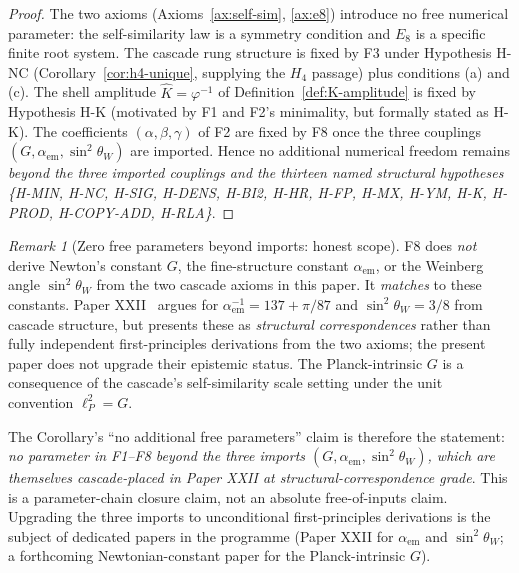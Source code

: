 \documentclass[12pt]{article}
\theoremstyle{definition}
\theoremstyle{remark}
\newtheorem{remark}[theorem]{Remark}
\begin{document}
\begin{proof}
The two axioms (Axioms~\ref{ax:self-sim}, \ref{ax:e8}) introduce no free numerical parameter: the self-similarity law is a symmetry condition and $E_8$ is a specific finite root system. The cascade rung structure is fixed by F3 under Hypothesis H-NC (Corollary~\ref{cor:h4-unique}, supplying the $H_4$ passage) plus conditions (a) and (c). The shell amplitude $\widehat{K} = \varphi^{-1}$ of Definition~\ref{def:K-amplitude} is fixed by Hypothesis H-K (motivated by F1 and F2's minimality, but formally stated as H-K). The coefficients $(\alpha, \beta, \gamma)$ of F2 are fixed by F8 once the three couplings $(G, \alpha_{\mathrm{em}}, \sin^2\theta_W)$ are imported. Hence no additional numerical freedom remains \emph{beyond the three imported couplings and the thirteen named structural hypotheses \{H-MIN, H-NC, H-SIG, H-DENS, H-BI2, H-HR, H-FP, H-MX, H-YM, H-K, H-PROD, H-COPY-ADD, H-RLA\}}.
\end{proof}

\begin{remark}[Zero free parameters beyond imports: honest scope]\label{rem:zero-param-scope}
F8 does \emph{not} derive Newton's constant $G$, the fine-structure constant $\alpha_{\mathrm{em}}$, or the Weinberg angle $\sin^2 \theta_W$ from the two cascade axioms in this paper. It \emph{matches} to these constants. Paper XXII~\citep{SmartXXII} argues for $\alpha_{\mathrm{em}}^{-1} = 137 + \pi / 87$ and $\sin^2 \theta_W = 3/8$ from cascade structure, but presents these as \emph{structural correspondences} rather than fully independent first-principles derivations from the two axioms; the present paper does not upgrade their epistemic status. The Planck-intrinsic $G$ is a consequence of the cascade's self-similarity scale setting under the unit convention $\ell_P^2 = G$.

The Corollary's ``no additional free parameters'' claim is therefore the statement: \emph{no parameter in F1--F8 beyond the three imports $(G, \alpha_{\mathrm{em}}, \sin^2\theta_W)$, which are themselves cascade-placed in Paper XXII at structural-correspondence grade}. This is a parameter-chain closure claim, not an absolute free-of-inputs claim. Upgrading the three imports to unconditional first-principles derivations is the subject of dedicated papers in the programme (Paper XXII for $\alpha_{\mathrm{em}}$ and $\sin^2\theta_W$; a forthcoming Newtonian-constant paper for the Planck-intrinsic $G$).
\end{remark}
\end{document}
